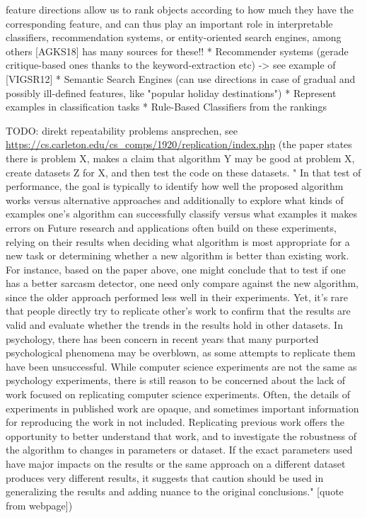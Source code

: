 \documentclass[11pt,
  paper=a4, 
  twoside,  %
  hidelinks,
  bibliography=totocnumbered,
	captions=tableheading,
	BCOR=10mm
]{scrreprt}
\theoremstyle{definition}
\begin{document}
feature directions allow us to rank objects according to how much they have the corresponding feature, and can thus play an important role in interpretable classifiers, recommendation systems, or entity-oriented search engines, among others  [AGKS18] has many sources for these!!
	* Recommender systems (gerade critique-based ones thanks to the keyword-extraction etc)
		-> see example of [VIGSR12]
	* Semantic Search Engines (can use directions in case of gradual and possibly ill-defined features, like "popular holiday destinations")
	* Represent examples in classification tasks
	* Rule-Based Classifiers from the rankings

TODO: direkt repeatability problems ansprechen, see \url{https://cs.carleton.edu/cs_comps/1920/replication/index.php} (the paper states there is problem X, makes a claim that algorithm Y may be good at problem X, create datasets Z for X, and then test the code on these datasets. " In that test of performance, the goal is typically to identify how well the proposed algorithm works versus alternative approaches and additionally to explore what kinds of examples one's algorithm can successfully classify versus what examples it makes errors on  Future research and applications often build on these experiments, relying on their results when deciding what algorithm is most appropriate for a new task or determining whether a new algorithm is better than existing work. For instance, based on the paper above, one might conclude that to test if one has a better sarcasm detector, one need only compare against the new algorithm, since the older approach performed less well in their experiments. Yet, it's rare that people directly try to replicate other's work to confirm that the results are valid and evaluate whether the trends in the results hold in other datasets. In psychology, there has been concern in recent years that many purported psychological phenomena may be overblown, as some attempts to replicate them have been unsuccessful. While computer science experiments are not the same as psychology experiments, there is still reason to be concerned about the lack of work focused on replicating computer science experiments. Often, the details of experiments in published work are opaque, and sometimes important information for reproducing the work in not included. Replicating previous work offers the opportunity to better understand that work, and to investigate the robustness of the algorithm to changes in parameters or dataset. If the exact parameters used have major impacts on the results or the same approach on a different dataset produces very different results, it suggests that caution should be used in generalizing the results and adding nuance to the original conclusions." [quote from webpage])
\end{document}
